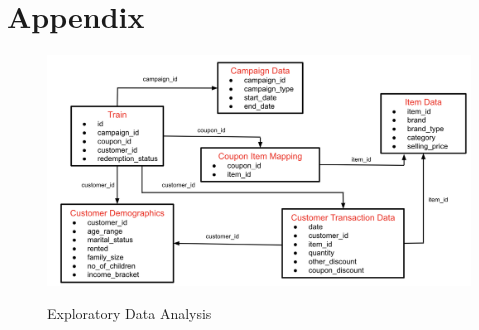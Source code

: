 \section{Appendix}
\label{sec:Appendix}
\begin{figure}[hbt!]
    \centering 
    \caption{Exploratory Data Analysis} 
    \includegraphics[width=5.5in]{img/data.png} 
    \label{fig:data} 
  \end{figure}
